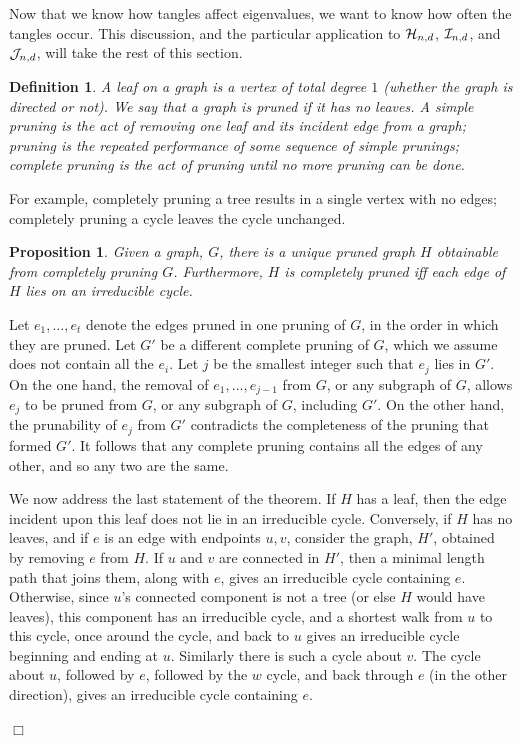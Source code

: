\documentclass[12pt]{article}
\newtheorem{proposition}[theorem]{Proposition}
\newtheorem{definition}[theorem]{Definition}
\newcommand{\ch}{{\cal H}}
\newcommand{\ci}{{\cal I}}
\newcommand{\cj}{{\cal J}}
\newcommand{\cjnd}{\cj_{n,d}}
\newcommand{\cind}{\ci_{n,d}}
\newcommand{\chnd}{\ch_{n,d}}
\newcommand{\proof}{{\par\noindent {\bf Proof}\space\space}}
\newcommand{\proofbox}{\begin{flushright}$\Box$\end{flushright}}
\begin{document}
Now that we know how tangles affect eigenvalues, we want to know how often
the tangles occur.  This discussion, and the particular application to
$\chnd$, $\cind$, and $\cjnd$, will take the rest of this section.

\begin{definition} A {\em leaf} on a graph is a vertex of total degree $1$
(whether the graph is directed or not).
We say that a graph is {\rm pruned} if it has no leaves.
A {\em simple pruning} is the act of removing one leaf and its incident
edge from a graph; {\em pruning} is the repeated performance of some
sequence of simple prunings; {\em complete pruning} is the act of pruning
until no more pruning can be done.
\end{definition}
For example, completely pruning a tree results in a single vertex with
no edges;
completely pruning a cycle leaves the cycle unchanged.
\begin{proposition}\label{pr:lies_on_irred}
Given a graph, $G$, there is a unique pruned graph $H$ 
obtainable from completely pruning $G$.  Furthermore, $H$ is completely
pruned iff each edge of $H$ lies on an irreducible cycle.
\end{proposition}
\proof Let $e_1,\ldots,e_t$ denote the edges pruned in
one pruning of $G$, in the
order in which they are pruned.  Let $G'$ be a different complete pruning
of $G$, which we assume does not contain all the $e_i$.  Let $j$ be the
smallest integer such that $e_j$ lies in $G'$.  On the one hand,
the removal of $e_1,\ldots,e_{j-1}$ from $G$, or any subgraph
of $G$, allows $e_j$
to be pruned from $G$, or any subgraph of $G$, including $G'$.  On the
other hand, the prunability of $e_j$ from $G'$ contradicts the completeness
of the pruning that formed $G'$.  It follows that any complete pruning
contains all the edges of any other, and so any two are the same.

We now address the last statement of the theorem.
If $H$ has a leaf, then the edge incident upon this leaf does
not lie in an irreducible cycle.  Conversely, if $H$ has no leaves,
and if $e$ is an edge with endpoints $u,v$, consider the graph, $H'$,
obtained by removing $e$ from $H$.  If $u$ and $v$ are connected in $H'$,
then a minimal length path that joins them, along with $e$, gives an
irreducible cycle containing $e$.  Otherwise, since $u$'s connected 
component is not a tree (or else $H$ would have leaves), this 
component has an irreducible cycle, and a shortest walk from $u$ to
this cycle, once around the cycle, and back to $u$ gives an irreducible
cycle beginning and ending at $u$.  Similarly there is such a cycle about
$v$.  The cycle about $u$, followed by $e$, followed by the $w$ cycle, and
back through $e$ (in the other direction), gives an irreducible cycle
containing $e$.
\proofbox
\end{document}
